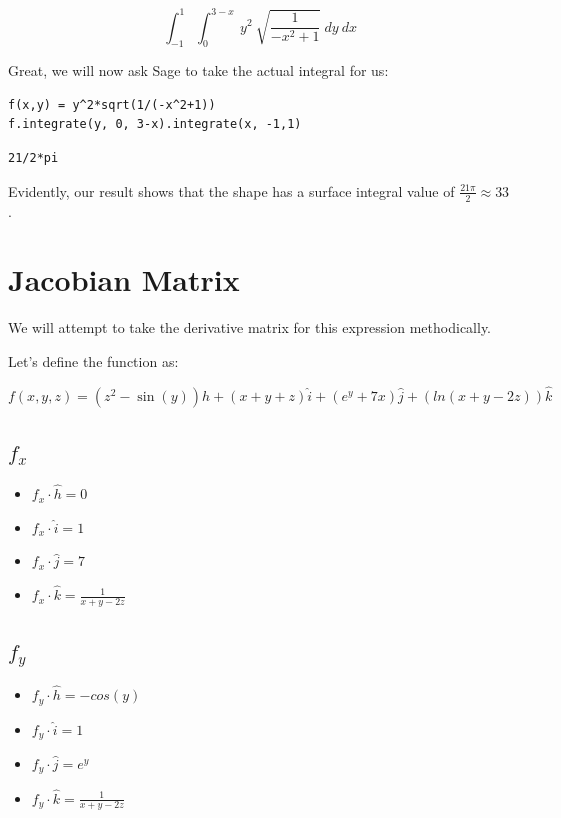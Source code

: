 \documentclass[letterpaper]{article}
\begin{document}
\begin{equation}
   \int_{-1}^1 \int_0^{3-x} \ y^2\ \sqrt{\frac{1}{-x^2+1}}\ dy\ dx
\end{equation}

Great, we will now ask Sage to take the actual integral for us:

\begin{verbatim}
f(x,y) = y^2*sqrt(1/(-x^2+1))
f.integrate(y, 0, 3-x).integrate(x, -1,1)
\end{verbatim}

\begin{verbatim}
21/2*pi
\end{verbatim}


Evidently, our result shows that the shape has a surface integral value of \(\frac{21\pi}{2} \approx 33\).

\section{Jacobian Matrix}
\label{sec:org32e8226}
We will attempt to take the derivative matrix for this expression methodically.

Let's define the function as:

\begin{equation}
   f(x,y,z) = (z^2-\sin(y)) \hat{h} + (x+y+z) \hat{i} + (e^y +7x) \hat{j} + (ln(x+y-2z)) \hat{k}
\end{equation}

\subsection{\(f_x\)}
\label{sec:org1dfd928}
\begin{itemize}
\item \(f_x \cdot {\hat{h}} = 0\)
\item \(f_x \cdot {\hat{i}} = 1\)
\item \(f_x \cdot {\hat{j}} = 7\)
\item \(f_x \cdot {\hat{k}} = \frac{1}{x+y-2z}\)
\end{itemize}

\subsection{\(f_y\)}
\label{sec:orgd60c2b4}
\begin{itemize}
\item \(f_y \cdot {\hat{h}} = -cos(y)\)
\item \(f_y \cdot {\hat{i}} = 1\)
\item \(f_y \cdot {\hat{j}} = e^y\)
\item \(f_y \cdot {\hat{k}} = \frac{1}{x+y-2z}\)
\end{itemize}
\end{document}
